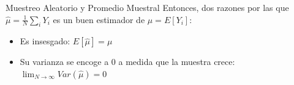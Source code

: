 \documentclass[11pt,handout,aspectratio=169]{beamer}
\begin{document}
\begin{frame}{Muestreo Aleatorio y Promedio Muestral}
\vspace{0.2cm}
Entonces, dos razones por las que $\hat{\mu}=\frac{1}{N}\sum_i Y_i$ es un buen estimador de $\mu=E[Y_i]$:

\begin{itemize}
\item Es insesgado: $E[\hat{\mu}]=\mu$
\vspace{0.1cm}
\item Su varianza se encoge a 0 a medida que la muestra crece: $\lim_{N\rightarrow\infty}Var(\hat{\mu})=0$ 
\end{itemize}
\vspace{0.5cm}


\end{frame}


%
%
%
%
%
\end{document}
